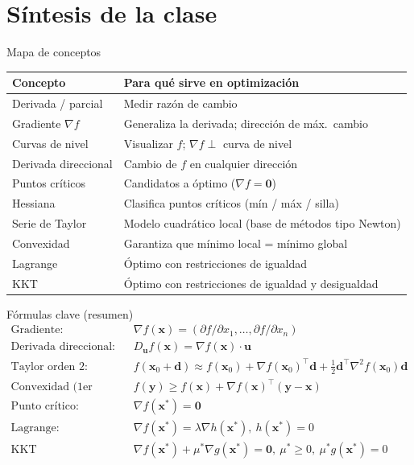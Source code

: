 \documentclass[aspectratio=169,10pt]{beamer}
\newcommand{\grad}{\nabla}
\newcommand{\x}{\mathbf{x}}
\newcommand{\dd}{\mathbf{d}}
\renewcommand{\u}{\mathbf{u}}
\newcommand{\Hess}{\nabla^2 f}
\begin{document}
\section{Síntesis de la clase}

\begin{frame}{Mapa de conceptos}
  \small
  \begin{center}
  \begin{tabular}{ll}
    \toprule
    \textbf{Concepto} & \textbf{Para qué sirve en optimización} \\
    \midrule
    Derivada / parcial & Medir razón de cambio \\
    Gradiente $\grad f$ & Generaliza la derivada; dirección de máx.\ cambio \\
    Curvas de nivel & Visualizar $f$; $\grad f \perp$ curva de nivel \\
    Derivada direccional & Cambio de $f$ en cualquier dirección \\
    Puntos críticos & Candidatos a óptimo ($\grad f=\mathbf 0$) \\
    Hessiana & Clasifica puntos críticos (mín / máx / silla) \\
    Serie de Taylor & Modelo cuadrático local (base de métodos tipo Newton) \\
    Convexidad & Garantiza que mínimo local = mínimo global \\
    Lagrange & Óptimo con restricciones de igualdad \\
    KKT & Óptimo con restricciones de igualdad y desigualdad \\
    \bottomrule
  \end{tabular}
  \end{center}
\end{frame}

\begin{frame}{Fórmulas clave (resumen)}
  \small
  \begin{align*}
    \text{Gradiente:} \quad & \grad f(\x) = \left(\partial f/\partial x_1,\dots,\partial f/\partial x_n\right) \\
    \text{Derivada direccional:} \quad & D_\u f(\x) = \grad f(\x)\cdot \u \\
    \text{Taylor orden 2:} \quad & f(\x_0+\dd)\approx f(\x_0)+\grad f(\x_0)^\top\dd+\tfrac12\dd^\top \Hess(\x_0)\dd \\
    \text{Convexidad (1er orden):} \quad & f(\mathbf y)\ge f(\x)+\grad f(\x)^\top(\mathbf y - \x) \\
    \text{Punto crítico:} \quad & \grad f(\x^*)=\mathbf 0 \\
    \text{Lagrange:} \quad & \grad f(\x^*)=\lambda\grad h(\x^*),\ h(\x^*)=0 \\
    \text{KKT (estacionariedad):} \quad & \grad f(\x^*)+\mu^*\grad g(\x^*)=\mathbf 0,\ \mu^*\ge0,\ \mu^* g(\x^*)=0
  \end{align*}
\end{frame}
\end{document}
